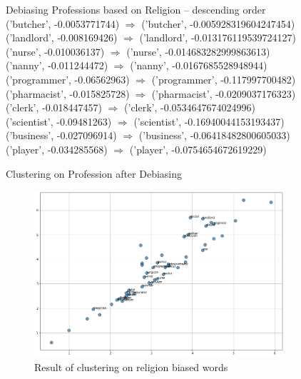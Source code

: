 \documentclass{beamer}
\begin{document}
		\begin{frame}
			Debiasing Professions based on Religion  -- descending order \\
			('butcher', -0.0053771744) $\Rightarrow$ ('butcher', -0.005928319604247454)
			\\	
			('landlord', -0.008169426) $\Rightarrow$ ('landlord', -0.013176119539724127)
			\\
			('nurse', -0.010036137) $\Rightarrow$ ('nurse', -0.014683282999863613)
			\\
			('nanny', -0.011244472) $\Rightarrow$ ('nanny', -0.0167685528948944)
			\\
			('programmer', -0.06562963) $\Rightarrow$ ('programmer', -0.117997700482)
			\\
			('pharmacist', -0.015825728) $\Rightarrow$ ('pharmacist', -0.0209037176323)
			\\
			('clerk', -0.018447457) $\Rightarrow$ ('clerk', -0.0534647674024996)
			\\	
			('scientist', -0.09481263) $\Rightarrow$ ('scientist', -0.16940044153193437)
			\\
			('business', -0.027096914) $\Rightarrow$ ('business', -0.06418482800605033)
			\\
			('player', -0.034285568) $\Rightarrow$ ('player', -0.0754654672619229)
			\\
		\end{frame}
	\begin{frame}{Clustering on Profession after Debiasing}
		\vspace{3mm}
		\begin{figure}[H]
			\centerline{\includegraphics[width=25em]{dwe3.png}}
			\caption{Result of clustering on religion biased words}
			\label{profession-debias-fig}
		\end{figure}
	\end{frame}
	
\end{document}
